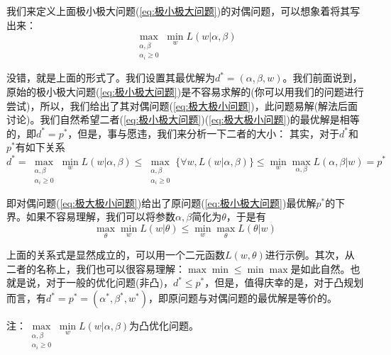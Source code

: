 		\par
		我们来定义上面极小极大问题(\ref{eq:极小极大问题})的对偶问题，可以想象着将其写出来：
		\begin{equation}\label{eq:极大极小问题}
		\max_{\substack{\alpha,\beta \\ \alpha_i \geqslant 0}}\min_wL(w|\alpha, \beta)
		\end{equation}
		\par
		没错，就是上面的形式了。我们设置其最优解为$d^*=(\alpha,\beta,w)$。我们前面说到，原始的极小极大问题(\ref{eq:极小极大问题})是不容易求解的(你可以用我们的问题进行尝试)，所以，我们给出了其对偶问题(\ref{eq:极大极小问题})，此问题易解(解法后面讨论)。我们自然希望二者(\ref{eq:极小极大问题})(\ref{eq:极大极小问题})的最优解是相等的，即$d^*=p^*$，但是，事与愿违，我们来分析一下二者的大小：
		其实，对于$d^*$和$p^*$有如下关系
		\begin{equation*}
		d^*=\max_{\substack{\alpha,\beta \\ \alpha_i \geqslant 0}}\min_wL(w|\alpha, \beta) \leqslant \max_{\substack{\alpha,\beta \\ \alpha_i \geqslant 0}}\{\forall w,L(w|\alpha,\beta)\} \leqslant \min_w\max_{\alpha,\beta}L(\alpha, \beta|w)=p^*
		\end{equation*}

		即对偶问题(\ref{eq:极大极小问题})给出了原问题(\ref{eq:极小极大问题})最优解$p^*$的下界。如果不容易理解，我们可以将参数$\alpha,\beta$简化为$\theta$，于是有
		\[
		\max_\theta\min_wL(w|\theta) \leqslant \min_w\max_\theta L(\theta|w)
		\]
		\par
		上面的关系式是显然成立的，可以用一个二元函数$L(w,\theta)$进行示例。其次，从二者的名称上，我们也可以很容易理解：$\max\min \leqslant \min\max$是如此自然。也就是说，对于一般的优化问题(非凸)，$d^* \leqslant p^*$，但是，值得庆幸的是，对于凸规划而言，有$d^*= p^*=(\alpha^*,\beta^*,w^*)$，即原问题与对偶问题的最优解是等价的。
		\par
		注：$\max \limits_{\substack{\alpha,\beta \\ \alpha_i \geqslant 0}}\min \limits_{ w}{L(w|\alpha, \beta)}$为凸优化问题。

